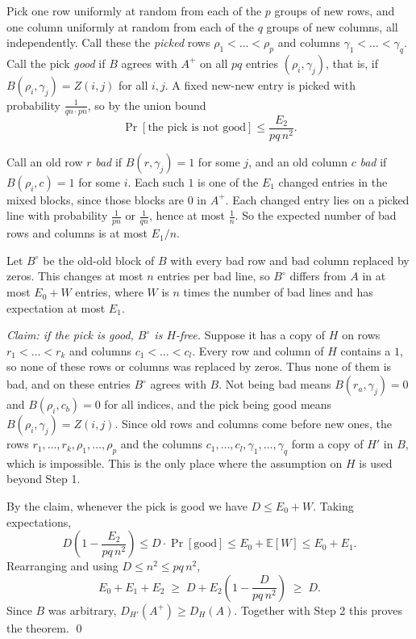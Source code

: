 \documentclass{article}
\theoremstyle{plain}
\theoremstyle{definition}
\begin{document}
Pick one row uniformly at random from each of the $p$ groups of new rows, and one column
uniformly at random from each of the $q$ groups of new columns, all independently. Call these
the \emph{picked} rows $\rho_1 < \dots < \rho_p$ and columns $\gamma_1 < \dots < \gamma_q$. Call
the pick \emph{good} if $B$ agrees with $A^+$ on all $pq$ entries $(\rho_i, \gamma_j)$, that is,
if $B(\rho_i, \gamma_j) = Z(i,j)$ for all $i, j$. A fixed new-new entry is picked with
probability $\frac{1}{qn \cdot pn}$, so by the union bound
\[
\Pr[\text{the pick is not good}] \le \frac{E_2}{pq\,n^2}.
\]

Call an old row $r$ \emph{bad} if $B(r, \gamma_j) = 1$ for some $j$, and an old column $c$
\emph{bad} if $B(\rho_i, c) = 1$ for some $i$. Each such $1$ is one of the $E_1$ changed entries
in the mixed blocks, since those blocks are $0$ in $A^+$. Each changed entry lies on a picked
line with probability $\frac{1}{pn}$ or $\frac{1}{qn}$, hence at most $\frac{1}{n}$. So the
expected number of bad rows and columns is at most $E_1/n$.

Let $B^\circ$ be the old-old block of $B$ with every bad row and bad column replaced by zeros.
This changes at most $n$ entries per bad line, so $B^\circ$ differs from $A$ in at most
$E_0 + W$ entries, where $W$ is $n$ times the number of bad lines and has expectation at most
$E_1$.

\emph{Claim: if the pick is good, $B^\circ$ is $H$-free.} Suppose it has a copy of $H$ on rows
$r_1 < \dots < r_k$ and columns $c_1 < \dots < c_l$. Every row and column of $H$ contains a $1$,
so none of these rows or columns was replaced by zeros. Thus none of them is bad, and on these
entries $B^\circ$ agrees with $B$. Not being bad means $B(r_a, \gamma_j) = 0$ and
$B(\rho_i, c_b) = 0$ for all indices, and the pick being good means
$B(\rho_i, \gamma_j) = Z(i,j)$. Since old rows and columns come before new ones, the rows
$r_1, \dots, r_k, \rho_1, \dots, \rho_p$ and the columns
$c_1, \dots, c_l, \gamma_1, \dots, \gamma_q$ form a copy of $H'$ in $B$, which is impossible.
This is the only place where the assumption on $H$ is used beyond Step 1.

By the claim, whenever the pick is good we have $D \le E_0 + W$. Taking expectations,
\[
D \left(1 - \frac{E_2}{pq\,n^2}\right) \le D \cdot \Pr[\text{good}] \le E_0 + \mathbb{E}[W]
\le E_0 + E_1 .
\]
Rearranging and using $D \le n^2 \le pq\,n^2$,
\[
E_0 + E_1 + E_2 \;\ge\; D + E_2\left(1 - \frac{D}{pq\,n^2}\right) \;\ge\; D .
\]
Since $B$ was arbitrary, $D_{H'}(A^+) \ge D_H(A)$. Together with Step 2 this proves the
theorem. \qed
\end{document}

